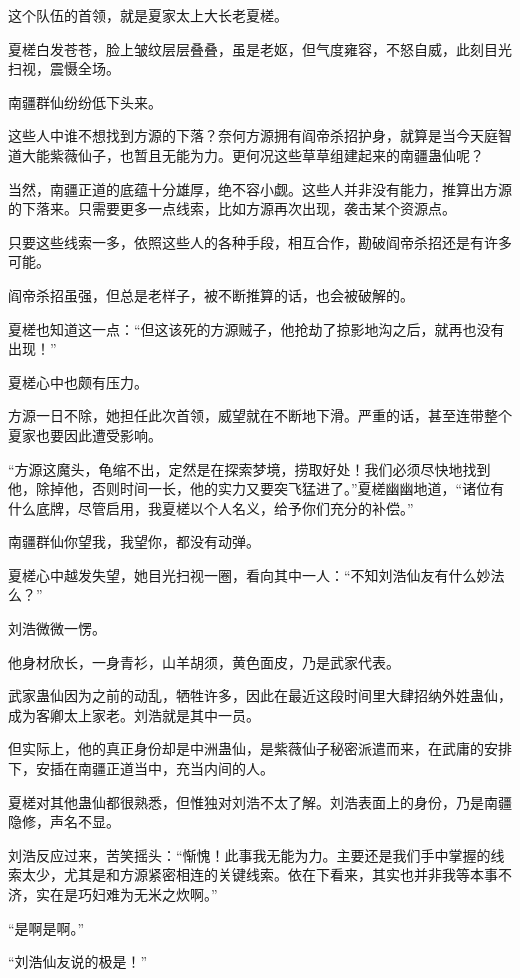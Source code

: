 \begin{this_body}
这个队伍的首领，就是夏家太上大长老夏槎。

夏槎白发苍苍，脸上皱纹层层叠叠，虽是老妪，但气度雍容，不怒自威，此刻目光扫视，震慑全场。

南疆群仙纷纷低下头来。

这些人中谁不想找到方源的下落？奈何方源拥有阎帝杀招护身，就算是当今天庭智道大能紫薇仙子，也暂且无能为力。更何况这些草草组建起来的南疆蛊仙呢？

当然，南疆正道的底蕴十分雄厚，绝不容小觑。这些人并非没有能力，推算出方源的下落来。只需要更多一点线索，比如方源再次出现，袭击某个资源点。

只要这些线索一多，依照这些人的各种手段，相互合作，勘破阎帝杀招还是有许多可能。

阎帝杀招虽强，但总是老样子，被不断推算的话，也会被破解的。

夏槎也知道这一点：“但这该死的方源贼子，他抢劫了掠影地沟之后，就再也没有出现！”

夏槎心中也颇有压力。

方源一日不除，她担任此次首领，威望就在不断地下滑。严重的话，甚至连带整个夏家也要因此遭受影响。

“方源这魔头，龟缩不出，定然是在探索梦境，捞取好处！我们必须尽快地找到他，除掉他，否则时间一长，他的实力又要突飞猛进了。”夏槎幽幽地道，“诸位有什么底牌，尽管启用，我夏槎以个人名义，给予你们充分的补偿。”

南疆群仙你望我，我望你，都没有动弹。

夏槎心中越发失望，她目光扫视一圈，看向其中一人：“不知刘浩仙友有什么妙法么？”

刘浩微微一愣。

他身材欣长，一身青衫，山羊胡须，黄色面皮，乃是武家代表。

武家蛊仙因为之前的动乱，牺牲许多，因此在最近这段时间里大肆招纳外姓蛊仙，成为客卿太上家老。刘浩就是其中一员。

但实际上，他的真正身份却是中洲蛊仙，是紫薇仙子秘密派遣而来，在武庸的安排下，安插在南疆正道当中，充当内间的人。

夏槎对其他蛊仙都很熟悉，但惟独对刘浩不太了解。刘浩表面上的身份，乃是南疆隐修，声名不显。

刘浩反应过来，苦笑摇头：“惭愧！此事我无能为力。主要还是我们手中掌握的线索太少，尤其是和方源紧密相连的关键线索。依在下看来，其实也并非我等本事不济，实在是巧妇难为无米之炊啊。”

“是啊是啊。”

“刘浩仙友说的极是！”


\end{this_body}

